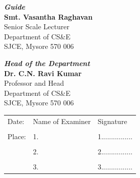 \documentclass[12pt]{report}
\begin{document}
\vspace{2cm}
\begin{minipage}[t]{0.5\textwidth}%
{\bf \emph{Guide}\\}
{\bf Smt. Vasantha Raghavan} \\
Senior Scale Lecturer\\
Department of CS\&E\\
SJCE, Mysore 570 006
\end{minipage}\hspace{2cm}
\begin{minipage}[t]{0.4\textwidth}%
{\bf \emph{Head of the Department}}\\
{\bf Dr. C.N. Ravi Kumar}\\
Professor and Head\\
Department of CS\&E\\
SJCE, Mysore 570 006
\end{minipage}

\vfill
\begin{flushleft}
\begin{tabular}{p{2in} p{2in} l} 
Date: & Name of Examiner & Signature\\
 & &\\
Place: & 1.  & 1................\\
& &\\ 
& 2. & 2................\\
& &\\ 
& 3. & 3................\\
\end{tabular}
\end{flushleft}
\end{document}

